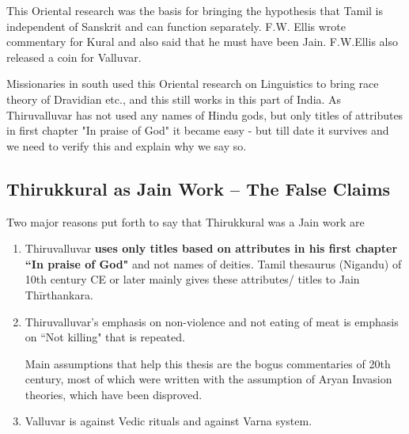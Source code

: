 This Oriental research was the basis for bringing the hypothesis that Tamil is independent of Sanskrit and can function separately. F.W. Ellis wrote commentary for Kural and also said that he must have been Jain. F.W.Ellis also released a coin for Valluvar.

Missionaries in south used this Oriental research on Linguistics to bring race theory of Dravidian etc., and this still works in this part of India. As Thiruvalluvar has not used any names of Hindu gods, but only titles of attributes in first chapter "In praise of God" it became easy - but till date it survives and we need to verify this and explain why we say so.

\newpage

\subsection*{Thirukkural as Jain Work – The False Claims}

Two major reasons put forth to say that Thirukkural was a Jain work are

\begin{enumerate}[{\rm 1)}]
\itemsep=0pt
\item Thiruvalluvar \textbf{uses only titles based on attributes in his first chapter “In praise of God"} and not names of deities. Tamil thesaurus (Nigandu) of 10th century CE or later mainly gives these attributes/ titles to Jain Thīrthankara.

 \item 
 Thiruvalluvar's emphasis on non-violence and not eating of meat is emphasis on “Not killing" that is repeated.

 Main assumptions that help this thesis are the bogus commentaries of 20th century, most of which were written with the assumption of Aryan Invasion theories, which have been disproved.

 \item Valluvar is against Vedic rituals and against Varna system.

\end{enumerate}


